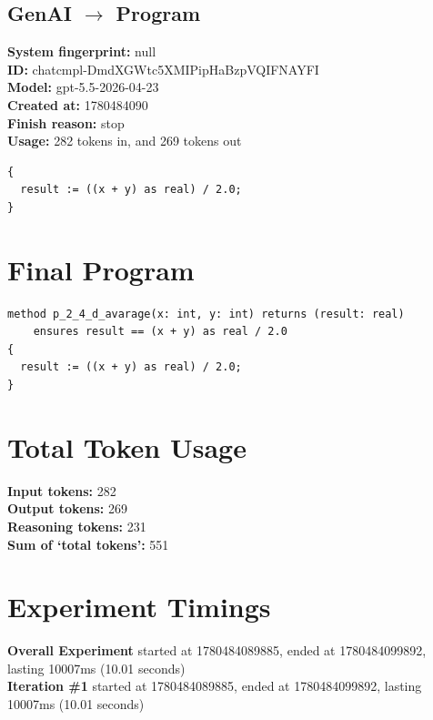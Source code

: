 \documentclass{article}
\begin{document}
\subsection*{GenAI $\rightarrow$ Program}
\textbf{System fingerprint: }null
\\\textbf{ID: }chatcmpl-DmdXGWtc5XMIPipHaBzpVQIFNAYFI
\\\textbf{Model: }gpt-5.5-2026-04-23
\\\textbf{Created at: }1780484090
\\\textbf{Finish reason: }stop
\\\textbf{Usage: }282 tokens in, and 269 tokens out
\begin{lstlisting}
{
  result := ((x + y) as real) / 2.0;
}
\end{lstlisting}
\section*{Final Program}
\begin{lstlisting}
method p_2_4_d_avarage(x: int, y: int) returns (result: real)
	ensures result == (x + y) as real / 2.0
{
  result := ((x + y) as real) / 2.0;
}
\end{lstlisting}
\section*{Total Token Usage}
\textbf{Input tokens: }282
\\\textbf{Output tokens: }269
\\\textbf{Reasoning tokens: }231
\\\textbf{Sum of `total tokens': }551
\section*{Experiment Timings}
\textbf{Overall Experiment} started at 1780484089885, ended at 1780484099892, lasting 10007ms (10.01 seconds)
\\\textbf{Iteration \#1} started at 1780484089885, ended at 1780484099892, lasting 10007ms (10.01 seconds)
\end{document}
